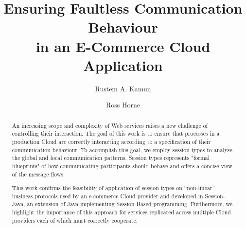 \documentclass[a4paper]{easychair}
\newcommand{\easychair}{\textsf{easychair}}
\begin{document}
%
\title{Ensuring Faultless Communication Behaviour\\
       in an E-Commerce Cloud Application}


\titlerunning{The {\easychair} Class File}

%
\author{
	Rustem A. Kamun \and Ross Horne
}




\clearpage

\maketitle

\begin{abstract}
  An increasing scope and complexity of Web services raises a new challenge of controlling their interaction. The goal of this work is to ensure that processes in a production Cloud are correctly interacting according to a specification of their communication behaviour. To accomplish this goal, we employ session types to analyse the global and local communication patterns. Session types represents "formal blueprints" of how communicating participants should behave and offers a concise view of the message flows.
  
  This work confirms the feasibility of application of session types on ``non-linear'' business protocols used by an e-commerce Cloud provider and developed in Session-Java, an extension of Java implementing Session-Based programming. Furthermore, we highlight the importance of this approach for services replicated across multiple Cloud providers each of which must correctly cooperate.
\end{abstract}
\end{document}

